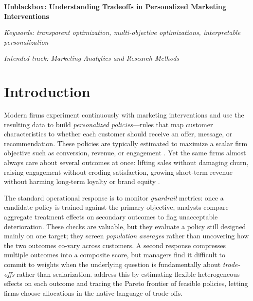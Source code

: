 \documentclass[12pt,a4paper]{article}
\begin{document}
\thispagestyle{plain}

\begin{center}
{\fontsize{14}{17}\selectfont\bfseries Unblackbox: Understanding Tradeoffs in Personalized Marketing Interventions\par}
\end{center}
\vspace{0.8\baselineskip}



\noindent{\fontsize{12}{18}\selectfont\EMACAbstractText\par}

\vspace{0.8\baselineskip}
\noindent\textit{Keywords: transparent optimization, multi-objective optimizations, interpretable personalization}

\vspace{0.5\baselineskip}
\noindent\textit{Intended track: Marketing Analytics and Research Methods}

\vspace{1.0\baselineskip}
\clearpage

\section{Introduction}

Modern firms experiment continuously with marketing interventions and use the resulting data to build \emph{personalized policies}---rules that map customer characteristics to whether each customer should receive an offer, message, or recommendation. These policies are typically estimated to maximize a scalar firm objective such as conversion, revenue, or engagement \citep{simester2020targeting, lemmens2025personalization}. Yet the same firms almost always care about several outcomes at once: lifting sales without damaging churn, raising engagement without eroding satisfaction, growing short-term revenue without harming long-term loyalty or brand equity \citep{hohnhold2015focusing, anderson2004longrun}.

The standard operational response is to monitor \emph{guardrail} metrics: once a candidate policy is trained against the primary objective, analysts compare aggregate treatment effects on secondary outcomes to flag unacceptable deterioration. These checks are valuable, but they evaluate a policy still designed mainly on one target; they screen \emph{population averages} rather than uncovering how the two outcomes co-vary across customers. A second response compresses multiple outcomes into a composite score, but managers find it difficult to commit to weights when the underlying question is fundamentally about \emph{trade-offs} rather than scalarization. \citet{rafieian2025multiobjective} address this by estimating flexible heterogeneous effects on each outcome and tracing the Pareto frontier of feasible policies, letting firms choose allocations in the native language of trade-offs.
\end{document}
